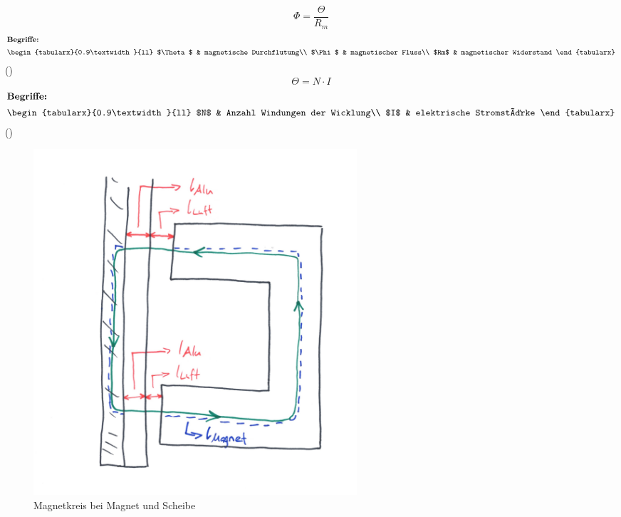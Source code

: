 \begin{equation}
  \label{equ:magnetischer_fluss}
  \Phi = \frac{\Theta}{R_m}
\end{equation}
\begin{gather}
\shortintertext{\textbf{Begriffe:}}
\begin{tabularx}{0.9\textwidth}{ll}
  $\Theta$	 &  magnetische Durchflutung\\
  $\Phi$	 &  magnetischer Fluss\\
  $Rm$ &  magnetischer Widerstand
\end{tabularx}\nonumber
\end{gather}
(\cite{schulmaterial_magnetismus})
\newpage
\begin{equation}
  \label{equ:magnetische_durchflutung}
  \Theta = N\cdot I
\end{equation}
\begin{gather}
\shortintertext{\textbf{Begriffe:}}
\begin{tabularx}{0.9\textwidth}{ll}
  $N$	 &  Anzahl Windungen der Wicklung\\
  $I$	 &  elektrische Stromstärke
\end{tabularx}\nonumber
\end{gather}
(\cite{schulmaterial_magnetismus})
\newpara
\begin{figure}[ht]
  \begin{center}
    \includegraphics[width=12cm]{assets/images/magnet_design/kreislauf_magnet_corrected}
  \end{center}
  \vspace{-3ex}
  \caption{Magnetkreis bei Magnet und Scheibe}
  \label{fig:magnet_kreisllaenge}
\end{figure}
